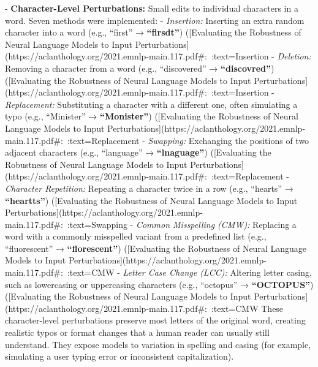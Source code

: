 - \textbf{Character-Level Perturbations:} Small edits to individual characters in a word. Seven methods were implemented:  
  - \textit{Insertion:} Inserting an extra random character into a word (e.g., “first” → \textbf{“firsdt”}) ([Evaluating the Robustness of Neural Language Models to Input Perturbations](https://aclanthology.org/2021.emnlp-main.117.pdf#:~:text=Insertion%
  - \textit{Deletion:} Removing a character from a word (e.g., “discovered” → \textbf{“discovred”}) ([Evaluating the Robustness of Neural Language Models to Input Perturbations](https://aclanthology.org/2021.emnlp-main.117.pdf#:~:text=Insertion%
  - \textit{Replacement:} Substituting a character with a different one, often simulating a typo (e.g., “Minister” → \textbf{“Monister”}) ([Evaluating the Robustness of Neural Language Models to Input Perturbations](https://aclanthology.org/2021.emnlp-main.117.pdf#:~:text=Replacement%
  - \textit{Swapping:} Exchanging the positions of two adjacent characters (e.g., “language” → \textbf{“lnaguage”}) ([Evaluating the Robustness of Neural Language Models to Input Perturbations](https://aclanthology.org/2021.emnlp-main.117.pdf#:~:text=Replacement%
  - \textit{Character Repetition:} Repeating a character twice in a row (e.g., “hearts” → \textbf{“heartts”}) ([Evaluating the Robustness of Neural Language Models to Input Perturbations](https://aclanthology.org/2021.emnlp-main.117.pdf#:~:text=Swapping%
  - \textit{Common Misspelling (CMW):} Replacing a word with a commonly misspelled variant from a predefined list (e.g., “fluorescent” → \textbf{“florescent”}) ([Evaluating the Robustness of Neural Language Models to Input Perturbations](https://aclanthology.org/2021.emnlp-main.117.pdf#:~:text=CMW%
  - \textit{Letter Case Change (LCC):} Altering letter casing, such as lowercasing or uppercasing characters (e.g., “octopus” → \textbf{“OCTOPUS”}) ([Evaluating the Robustness of Neural Language Models to Input Perturbations](https://aclanthology.org/2021.emnlp-main.117.pdf#:~:text=CMW%
  These character-level perturbations preserve most letters of the original word, creating realistic typos or format changes that a human reader can usually still understand. They expose models to variation in spelling and casing (for example, simulating a user typing error or inconsistent capitalization).

